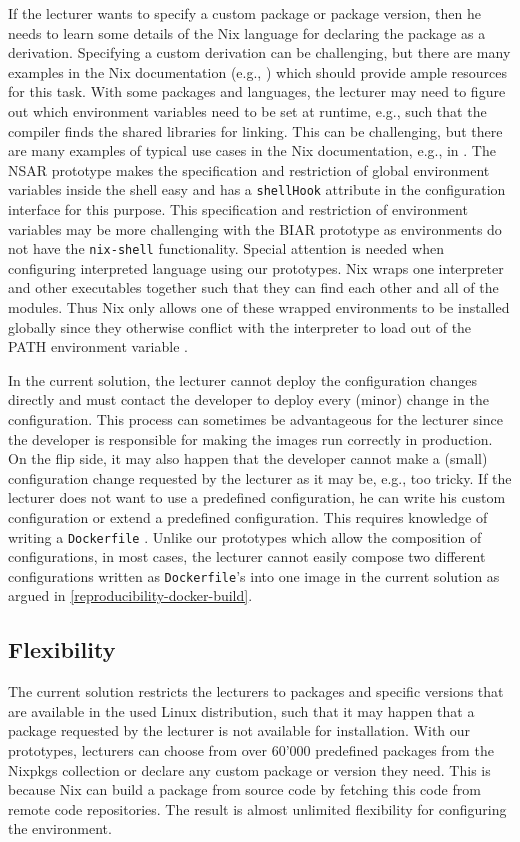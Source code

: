 If the lecturer wants to specify a custom package or package version, then he needs to learn some details of the Nix language for declaring the package as a derivation. Specifying a custom derivation can be challenging, but there are many examples in the Nix documentation (e.g., \cite{NixPythonGuide}) which should provide ample resources for this task. With some packages and languages, the lecturer may need to figure out which environment variables need to be set at runtime, e.g., such that the compiler finds the shared libraries for linking. This can be challenging, but there are many examples of typical use cases in the Nix documentation, e.g., in \cite{NixPythonGuide}. The NSAR prototype makes the specification and restriction of global environment variables inside the shell easy and has a \verb|shellHook| attribute in the configuration interface for this purpose. This specification and restriction of environment variables may be more challenging with the BIAR prototype as environments do not have the \verb|nix-shell| functionality. Special attention is needed when configuring interpreted language using our prototypes. Nix wraps one interpreter and other executables together such that they can find each other and all of the modules. Thus Nix only allows one of these wrapped environments to be installed globally since they otherwise conflict with the interpreter to load out of the PATH environment variable \cite{NixPythonGuide}.

In the current solution, the lecturer cannot deploy the configuration changes directly and must contact the developer to deploy every (minor) change in the configuration. This process can sometimes be advantageous for the lecturer since the developer is responsible for making the images run correctly in production. On the flip side, it may also happen that the developer cannot make a (small) configuration change requested by the lecturer as it may be, e.g., too tricky. If the lecturer does not want to use a predefined configuration, he can write his custom configuration or extend a predefined configuration. This requires knowledge of writing a \verb|Dockerfile| \cite{CXDocs}. Unlike our prototypes which allow the composition of configurations, in most cases, the lecturer cannot easily compose two different configurations written as \verb|Dockerfile|'s into one image in the current solution as argued in \ref{reproducibility-docker-build}.

\subsection{Flexibility}
The current solution restricts the lecturers to packages and specific versions that are available in the used Linux distribution, such that it may happen that a package requested by the lecturer is not available for installation. With our prototypes, lecturers can choose from over 60'000 predefined packages from the Nixpkgs collection or declare any custom package or version they need. This is because Nix can build a package from source code by fetching this code from remote code repositories. The result is almost unlimited flexibility for configuring the environment. 

